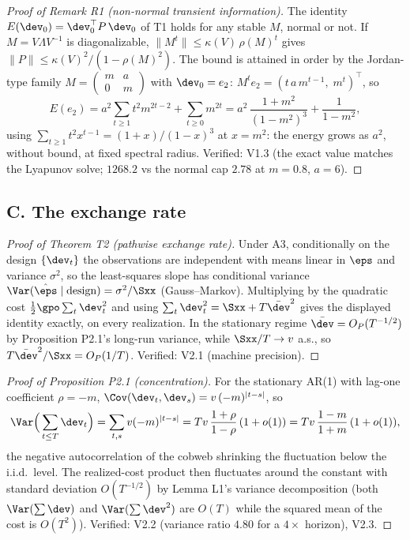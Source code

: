 \begin{proof}[Proof of Remark R1 (non-normal transient information)]
The identity $E(\dev_0) = \dev_0^\top P\,\dev_0$ of T1 holds for any stable
$M$, normal or not. If $M = V\Lambda V^{-1}$ is diagonalizable,
$\|M^t\| \le \kappa(V)\,\rho(M)^t$ gives
$\|P\| \le \kappa(V)^2/(1-\rho(M)^2)$. The bound is attained in order by the
Jordan-type family $M = \begin{pmatrix} m & a \\ 0 & m\end{pmatrix}$ with
$\dev_0 = e_2$: $M^t e_2 = (t\,a\,m^{t-1},\; m^t)^\top$, so
\[
E(e_2) = a^2 \sum_{t\ge 1} t^2 m^{2t-2} + \sum_{t \ge 0} m^{2t}
 = a^2\,\frac{1+m^2}{(1-m^2)^3} + \frac{1}{1-m^2},
\]
using $\sum_{t\ge1} t^2 x^{t-1} = (1+x)/(1-x)^3$ at $x = m^2$: the energy
grows as $a^2$, without bound, at fixed spectral radius. Verified: V1.3
(the exact value matches the Lyapunov solve; $1268.2$ vs the normal cap
$2.78$ at $m = 0.8$, $a = 6$).
\end{proof}

\subsection*{C. The exchange rate}

\begin{proof}[Proof of Theorem T2 (pathwise exchange rate)]
Under A3, conditionally on the design $\{\dev_t\}$ the observations are
independent with means linear in $\eps$ and variance $\sigma^2$, so the
least-squares slope has conditional variance
$\Var(\hat\eps \mid \mathrm{design}) = \sigma^2/\Sxx$ (Gauss--Markov).
Multiplying by the quadratic cost $\tfrac{1}{2}\gpo \sum_t \dev_t^2$ and
using $\sum_t \dev_t^2 = \Sxx + T\bar\dev^2$ gives the displayed identity
exactly, on every realization. In the stationary regime
$\bar\dev = O_P(T^{-1/2})$ by Proposition P2.1's long-run variance, while
$\Sxx/T \to v$ a.s., so $T\bar\dev^2/\Sxx = O_P(1/T)$. Verified: V2.1
(machine precision).
\end{proof}

\begin{proof}[Proof of Proposition P2.1 (concentration)]
For the stationary AR(1) with lag-one coefficient $\rho = -m$,
$\Cov(\dev_t, \dev_s) = v\,(-m)^{|t-s|}$, so
\[
\Var\Big(\sum_{t \le T}\dev_t\Big) = \sum_{t,s} v (-m)^{|t-s|}
 = T v\,\frac{1+\rho}{1-\rho}\,(1+o(1)) = T v\,\frac{1-m}{1+m}\,(1+o(1)),
\]
the negative autocorrelation of the cobweb shrinking the fluctuation below
the i.i.d.\ level. The realized-cost product then fluctuates around the
constant with standard deviation $O(T^{-1/2})$ by Lemma L1's variance
decomposition (both $\Var(\sum\dev)$ and $\Var(\sum\dev^2)$ are $O(T)$
while the squared mean of the cost is $O(T^2)$). Verified: V2.2 (variance
ratio $4.80$ for a $4\times$ horizon), V2.3.
\end{proof}

